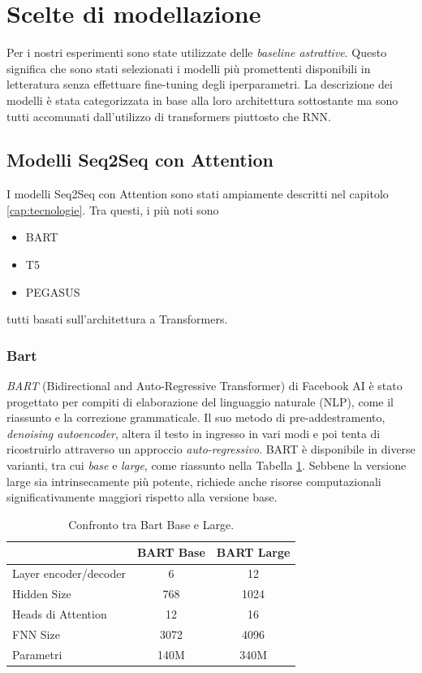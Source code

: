\documentclass[12pt,a4paper,twoside,openright]{book}
\begin{document}
\section{Scelte di modellazione}
Per i nostri esperimenti sono state utilizzate delle \emph{baseline astrattive}. Questo significa che sono stati selezionati i modelli più promettenti disponibili in letteratura senza effettuare fine-tuning degli iperparametri. La descrizione dei modelli è stata categorizzata in base alla loro architettura sottostante ma sono tutti accomunati dall'utilizzo di transformers piuttosto che RNN.

\subsection{Modelli Seq2Seq con Attention}
I modelli Seq2Seq con Attention sono stati ampiamente descritti nel capitolo \ref{cap:tecnologie}. Tra questi, i più noti sono 
\begin{itemize}
    \item BART
    \item T5
    \item PEGASUS
\end{itemize}
tutti basati sull'architettura a Transformers.

\subsubsection{Bart}
\emph{BART} (Bidirectional and Auto-Regressive Transformer) \cite{DBLP:journals/corr/abs-1910-13461} di Facebook AI è stato progettato per compiti di elaborazione del linguaggio naturale (NLP), come il riassunto e la correzione grammaticale. Il suo metodo di pre-addestramento, \emph{denoising autoencoder}, altera il testo in ingresso in vari modi e poi tenta di ricostruirlo attraverso un approccio \emph{auto-regressivo}. BART è disponibile in diverse varianti, tra cui \emph{base} e \emph{large}, come riassunto nella Tabella \ref{tab:bart-comparison}. Sebbene la versione large sia intrinsecamente più potente, richiede anche risorse computazionali significativamente maggiori rispetto alla versione base. 

\begin{table}
    \centering
    \begin{tabular}{|l|c|c|}
    \hline
    & BART Base & BART Large \\ \hline
    Layer encoder/decoder & 6 & 12 \\ 
    Hidden Size & 768 & 1024 \\ 
    Heads di Attention & 12 & 16 \\
    FNN Size & 3072 & 4096 \\ 
    Parametri & 140M & 340M \\ \hline
    \end{tabular}
    \caption{Confronto tra Bart Base e Large.}
    \label{tab:bart-comparison}
\end{table}
\end{document}
